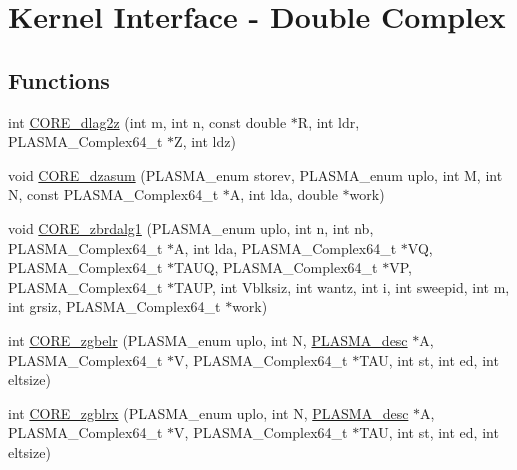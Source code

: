 \hypertarget{group__CORE__PLASMA__Complex64__t}{}\section{Kernel Interface -\/ Double Complex}
\label{group__CORE__PLASMA__Complex64__t}
\subsection*{Functions}
\begin{DoxyCompactItemize}
\item 
int \hyperlink{group__CORE__PLASMA__Complex64__t_ga571c4b35d95d088ba3628bd31f883abc_ga571c4b35d95d088ba3628bd31f883abc}{C\+O\+R\+E\+\_\+dlag2z} (int m, int n, const double $\ast$R, int ldr, P\+L\+A\+S\+M\+A\+\_\+\+Complex64\+\_\+t $\ast$Z, int ldz)
\item 
void \hyperlink{group__CORE__PLASMA__Complex64__t_ga0aa66110f876c0578b44c44712d8859b_ga0aa66110f876c0578b44c44712d8859b}{C\+O\+R\+E\+\_\+dzasum} (P\+L\+A\+S\+M\+A\+\_\+enum storev, P\+L\+A\+S\+M\+A\+\_\+enum uplo, int M, int N, const P\+L\+A\+S\+M\+A\+\_\+\+Complex64\+\_\+t $\ast$A, int lda, double $\ast$work)
\item 
void \hyperlink{group__CORE__PLASMA__Complex64__t_gaee9088cae8be467761727054418679f8_gaee9088cae8be467761727054418679f8}{C\+O\+R\+E\+\_\+zbrdalg1} (P\+L\+A\+S\+M\+A\+\_\+enum uplo, int n, int nb, P\+L\+A\+S\+M\+A\+\_\+\+Complex64\+\_\+t $\ast$A, int lda, P\+L\+A\+S\+M\+A\+\_\+\+Complex64\+\_\+t $\ast$V\+Q, P\+L\+A\+S\+M\+A\+\_\+\+Complex64\+\_\+t $\ast$T\+A\+U\+Q, P\+L\+A\+S\+M\+A\+\_\+\+Complex64\+\_\+t $\ast$V\+P, P\+L\+A\+S\+M\+A\+\_\+\+Complex64\+\_\+t $\ast$T\+A\+U\+P, int Vblksiz, int wantz, int i, int sweepid, int m, int grsiz, P\+L\+A\+S\+M\+A\+\_\+\+Complex64\+\_\+t $\ast$work)
\item 
int \hyperlink{group__CORE__PLASMA__Complex64__t_ga7c61b669a3416e73209a8ebec8956248_ga7c61b669a3416e73209a8ebec8956248}{C\+O\+R\+E\+\_\+zgbelr} (P\+L\+A\+S\+M\+A\+\_\+enum uplo, int N, \hyperlink{structplasma__desc__t}{P\+L\+A\+S\+M\+A\+\_\+desc} $\ast$A, P\+L\+A\+S\+M\+A\+\_\+\+Complex64\+\_\+t $\ast$V, P\+L\+A\+S\+M\+A\+\_\+\+Complex64\+\_\+t $\ast$T\+A\+U, int st, int ed, int eltsize)
\item 
int \hyperlink{group__CORE__PLASMA__Complex64__t_gab41faa690babe3592ee00e3ea3d75daf_gab41faa690babe3592ee00e3ea3d75daf}{C\+O\+R\+E\+\_\+zgblrx} (P\+L\+A\+S\+M\+A\+\_\+enum uplo, int N, \hyperlink{structplasma__desc__t}{P\+L\+A\+S\+M\+A\+\_\+desc} $\ast$A, P\+L\+A\+S\+M\+A\+\_\+\+Complex64\+\_\+t $\ast$V, P\+L\+A\+S\+M\+A\+\_\+\+Complex64\+\_\+t $\ast$T\+A\+U, int st, int ed, int eltsize)

\end{DoxyCompactItemize}
